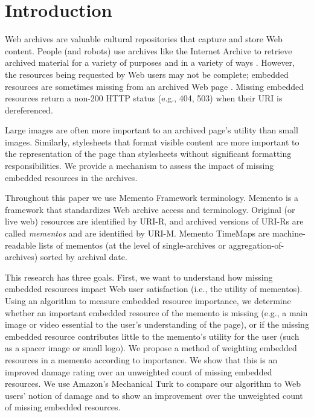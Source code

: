 \section{Introduction}
\label{introduction}
Web archives are valuable cultural repositories that capture and store Web content. People (and robots) use archives like the Internet Archive \cite{iawebarchive, waybackarchives2} to retrieve archived material \cite{usingIA, marshalls_social_media_study} for a variety of purposes and in a variety of ways \cite{yasminLinks}. However, the resources being requested by Web users may not be complete; embedded resources are sometimes missing from an archived Web page \cite{ipresArchivability}. Missing embedded resources return a non-200 HTTP status (e.g., 404, 503) when their URI is dereferenced.

Large images are often more important to an archived page's utility than small images. Similarly, stylesheets that format visible content are more important to the representation of the page than stylesheets without significant formatting responsibilities. We provide a mechanism to assess the impact of missing embedded resources in the archives.

Throughout this paper we use Memento Framework terminology. Memento \cite{nelson:memento:tr} is a framework that standardizes Web archive access and terminology. Original (or live web) resources are identified by URI-R, and archived versions of URI-Rs are called \emph{mementos} and are identified by URI-M. Memento TimeMaps are machine-readable lists of mementos (at the level of single-archives or aggregation-of-archives) sorted by archival date.

This research has three goals. First, we want to understand how missing embedded resources impact Web user satisfaction (i.e., the utility of mementos). Using an algorithm to measure embedded resource importance, we determine whether an important embedded resource of the memento is missing (e.g., a main image or video essential to the user's understanding of the page), or if the missing embedded resource contributes little to the memento's utility for the user (such as a spacer image or small logo). We propose a method of weighting embedded resources in a memento according to importance. We show that this is an improved damage rating over an unweighted count of missing embedded resources. We use Amazon's Mechanical Turk to compare our algorithm to Web users' notion of damage and to show an improvement over the unweighted count of missing embedded resources.

